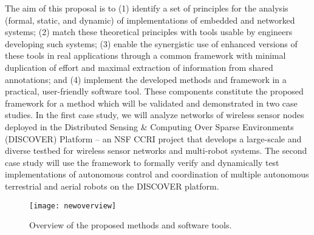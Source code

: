 
The aim of this proposal is to (1) identify a set of principles for
the analysis (formal, static, and dynamic) of implementations of
embedded and networked systems; (2) match these theoretical principles
with tools usable by engineers developing such systems; (3) enable
the synergistic use of enhanced versions of these tools in real
applications through a common framework with minimal duplication of
effort and maximal extraction of information from shared annotations; and (4) implement the developed methods and framework in a practical, user-friendly software tool.
These components constitute the proposed framework for a method which will be validated and demonstrated in two case studies.
In the first case study, we will analyze networks of wireless sensor nodes deployed %
in the Distributed Sensing \& Computing Over Sparse Environments (DISCOVER) Platform -- an NSF CCRI project that develops a large-scale and diverse testbed for wireless sensor networks and
multi-robot systems.  The second case study will use the framework to formally verify and dynamically test implementations of autonomous control and coordination of multiple autonomous terrestrial and aerial robots on the DISCOVER platform.

\begin{figure}[!t]
  \centering
  \texttt{[image: newoverview]}
  \caption{Overview of the proposed methods and software tools.\vspace{-4pt}}
  \label{fig:overview}
\end{figure}

